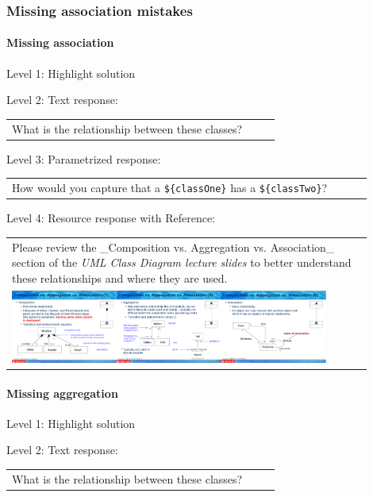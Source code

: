 \subsubsection{Missing association mistakes}

\paragraph{Missing association}

\noindent Level 1: Highlight solution \medskip

\noindent Level 2: Text response: \medskip

\begin{tabular}{|p{0.9\linewidth}}
What is the relationship between these classes?
\end{tabular} \medskip

\noindent Level 3: Parametrized response: \medskip

\begin{tabular}{|p{0.9\linewidth}}
How would you capture that a \verb|${classOne}| has a \verb|${classTwo}|?
\end{tabular} \medskip

\noindent Level 4: Resource response with Reference: \medskip

\begin{tabular}{|p{0.9\linewidth}}
Please review the _Composition vs. Aggregation vs. Association_ section of 
the \textit{UML Class Diagram lecture slides} to 
better understand these relationships and where they are used.

\\
\includegraphics[width=0.9\textwidth]{images/composition_aggregation_association.png}
\end{tabular} \medskip


\paragraph{Missing aggregation}

\noindent Level 1: Highlight solution \medskip

\noindent Level 2: Text response: \medskip

\begin{tabular}{|p{0.9\linewidth}}
What is the relationship between these classes?
\end{tabular} \medskip

